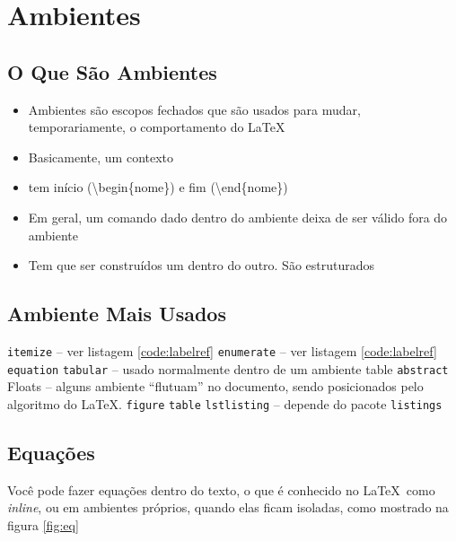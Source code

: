 \section{Ambientes}
\subsection{O Que São Ambientes}

    \begin{itemize}
        \item Ambientes são escopos fechados que são usados para mudar, temporariamente, o comportamento do \LaTeX\
        \item Basicamente, um contexto
        \item tem início (\textbackslash begin\{nome\}) e fim (\textbackslash end\{nome\})
        \item Em geral, um comando dado dentro do ambiente deixa de ser válido fora do ambiente
        \item Tem que ser construídos um dentro do outro. São estruturados
    \end{itemize}

\subsection{Ambiente Mais Usados}
\begin{outline}
    \1 \lstinline|itemize| -- ver listagem \ref{code:labelref}
    \1 \lstinline|enumerate| -- ver listagem \ref{code:labelref}
    \1 \lstinline|equation|
    \1 \lstinline|tabular|  -- usado normalmente dentro de um ambiente table
    \1 \lstinline|abstract|
    \1 Floats -- alguns ambiente ``flutuam'' no documento,
    sendo posicionados pelo algoritmo do \LaTeX.
    \2 \lstinline|figure|
    \2 \lstinline|table|
    \2 \lstinline|lstlisting| -- depende do pacote \lstinline|listings|
\end{outline}

\subsection{Equações}

Você pode fazer equações dentro do texto, o que é conhecido no \LaTeX\ como \textit{inline}, ou em ambientes próprios, quando elas ficam isoladas, como mostrado na figura \ref{fig:eq}

